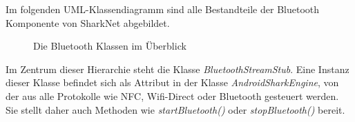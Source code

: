 Im folgenden UML-Klassendiagramm sind alle Bestandteile der Bluetooth Komponente von SharkNet abgebildet.
\begin{figure}[H]
	\centering
	\hspace*{1cm}
	\caption{Die Bluetooth Klassen im Überblick}
	\label{fig:bluetoothAll}
\end{figure}
Im Zentrum dieser Hierarchie steht die Klasse \textit{BluetoothStreamStub}. Eine Instanz dieser Klasse befindet sich als Attribut in der Klasse \textit{AndroidSharkEngine}, von der aus alle Protokolle wie NFC, Wifi-Direct oder Bluetooth gesteuert werden. Sie stellt daher auch Methoden wie \textit{startBluetooth()} oder \textit{stopBluetooth()} bereit. 






